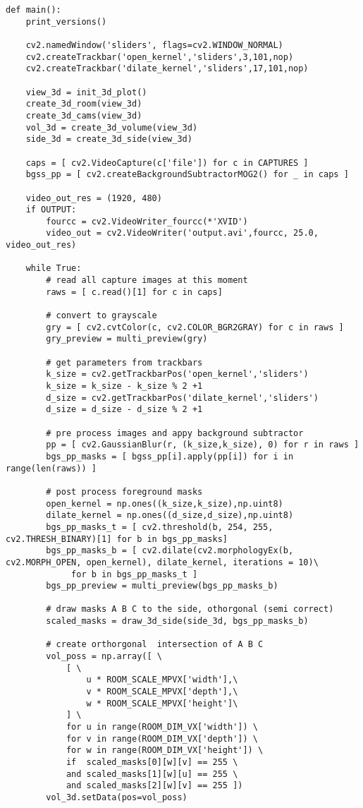 \begin{lstlisting}[caption={Main function of the volume intersection program}, label={lst:app:volmain}]
def main():
    print_versions()

    cv2.namedWindow('sliders', flags=cv2.WINDOW_NORMAL)
    cv2.createTrackbar('open_kernel','sliders',3,101,nop)
    cv2.createTrackbar('dilate_kernel','sliders',17,101,nop)

    view_3d = init_3d_plot()
    create_3d_room(view_3d)
    create_3d_cams(view_3d)
    vol_3d = create_3d_volume(view_3d)
    side_3d = create_3d_side(view_3d)

    caps = [ cv2.VideoCapture(c['file']) for c in CAPTURES ]
    bgss_pp = [ cv2.createBackgroundSubtractorMOG2() for _ in caps ]

    video_out_res = (1920, 480)
    if OUTPUT:
        fourcc = cv2.VideoWriter_fourcc(*'XVID')
        video_out = cv2.VideoWriter('output.avi',fourcc, 25.0, video_out_res)

    while True:
        # read all capture images at this moment
        raws = [ c.read()[1] for c in caps]

        # convert to grayscale
        gry = [ cv2.cvtColor(c, cv2.COLOR_BGR2GRAY) for c in raws ]
        gry_preview = multi_preview(gry)

        # get parameters from trackbars
        k_size = cv2.getTrackbarPos('open_kernel','sliders')
        k_size = k_size - k_size % 2 +1
        d_size = cv2.getTrackbarPos('dilate_kernel','sliders')
        d_size = d_size - d_size % 2 +1

        # pre process images and appy background subtractor
        pp = [ cv2.GaussianBlur(r, (k_size,k_size), 0) for r in raws ]
        bgs_pp_masks = [ bgss_pp[i].apply(pp[i]) for i in range(len(raws)) ]

        # post process foreground masks
        open_kernel = np.ones((k_size,k_size),np.uint8)
        dilate_kernel = np.ones((d_size,d_size),np.uint8)
        bgs_pp_masks_t = [ cv2.threshold(b, 254, 255, cv2.THRESH_BINARY)[1] for b in bgs_pp_masks]
        bgs_pp_masks_b = [ cv2.dilate(cv2.morphologyEx(b, cv2.MORPH_OPEN, open_kernel), dilate_kernel, iterations = 10)\
             for b in bgs_pp_masks_t ]
        bgs_pp_preview = multi_preview(bgs_pp_masks_b)

        # draw masks A B C to the side, othorgonal (semi correct)
        scaled_masks = draw_3d_side(side_3d, bgs_pp_masks_b)

        # create orthorgonal  intersection of A B C
        vol_poss = np.array([ \
            [ \
                u * ROOM_SCALE_MPVX['width'],\
                v * ROOM_SCALE_MPVX['depth'],\
                w * ROOM_SCALE_MPVX['height']\
            ] \
            for u in range(ROOM_DIM_VX['width']) \
            for v in range(ROOM_DIM_VX['depth']) \
            for w in range(ROOM_DIM_VX['height']) \
            if  scaled_masks[0][w][v] == 255 \
            and scaled_masks[1][w][u] == 255 \
            and scaled_masks[2][w][v] == 255 ])
        vol_3d.setData(pos=vol_poss)


\end{lstlisting}
